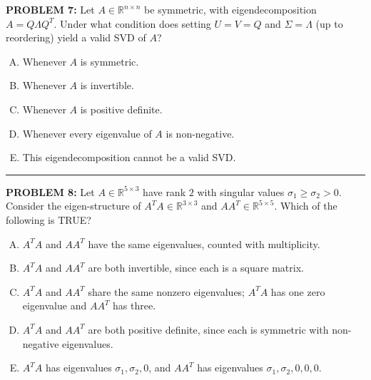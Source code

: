 \documentclass[12pt]{amsart}
\newcommand{\divider}{
  \vspace{-1em} %
  \noindent
  \raisebox{-0.15ex}{\textbullet}%
  \hspace{0.5em}%
  \rule[0.5ex]{0.95\textwidth}{1.0pt}%
  \hspace{0.5em}%
  \raisebox{-0.15ex}{\textbullet}%
  \vspace{0em} %
}
\begin{document}
{\bf PROBLEM 7:}
Let $A \in \mathbb{R}^{n \times n}$ be symmetric, with eigendecomposition $A = Q\Lambda Q^T$.
Under what condition does setting $U = V = Q$ and $\Sigma = \Lambda$ (up to reordering) yield a
valid SVD of $A$?
\begin{enumerate}[(A)]
\item Whenever $A$ is symmetric.
\item Whenever $A$ is invertible.
\item Whenever $A$ is positive definite.
\item Whenever every eigenvalue of $A$ is non-negative.
\item This eigendecomposition cannot be a valid SVD.
\end{enumerate}
%
\divider

\newpage


{\bf PROBLEM 8:}
%
Let $A \in \mathbb{R}^{5 \times 3}$ have rank $2$ with singular values $\sigma_1 \geq \sigma_2 > 0$. Consider the eigen-structure of $A^TA \in \mathbb{R}^{3 \times 3}$ and $AA^T \in \mathbb{R}^{5 \times 5}$.
% 
Which of the following is TRUE?

\begin{enumerate}[(A)]
\item $A^TA$ and $AA^T$ have the same eigenvalues, counted with multiplicity.
\item $A^TA$ and $AA^T$ are both invertible, since each is a square matrix.
\item $A^TA$ and $AA^T$ share the same nonzero eigenvalues; $A^TA$ has one zero eigenvalue and $AA^T$ has three.
\item $A^TA$ and $AA^T$ are both positive definite, since each is symmetric with non-negative eigenvalues.
\item $A^TA$ has eigenvalues $\sigma_1, \sigma_2, 0$, and $AA^T$ has eigenvalues $\sigma_1, \sigma_2, 0, 0, 0$.
\end{enumerate}
\end{document}

